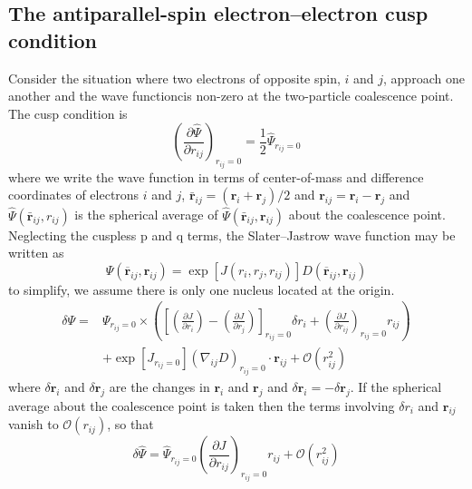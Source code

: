 \documentclass[12pt]{article}
\begin{document}
\subsection*{\normalsize The antiparallel-spin electron–electron cusp condition}

Consider the situation where two electrons of opposite spin, $i$ and $j$, approach 
one another and the wave functioncis non-zero at the two-particle coalescence point.
The cusp condition is
\begin{equation}\label{2}
    \left(\frac{\partial \hat{\Psi}}{\partial r_{i j}}\right)_{r_{i j}=0}=
    \frac{1}{2} \hat{\Psi}_{r_{i j}=0}
\end{equation} 
where we write the wave function in terms of center-of-mass and difference coordinates 
of electrons $i$ and $j$, $\bar{\mathbf{r}}_{ij}=(\mathbf{r}_i+\mathbf{r}_j)/2$ and 
$\mathbf{r}_{ij}=\mathbf{r}_i-\mathbf{r}_j$ and 
$\hat{\Psi}(\bar{\mathbf{r}}_{ij},r_{ij})$ is the spherical average of 
$\hat{\Psi}(\bar{\mathbf{r}}_{ij},\mathbf{r}_{ij})$ about the coalescence point. 
Neglecting the cuspless p and q terms, the Slater–Jastrow wave function may be 
written as
\begin{equation}
    \Psi\left(\overline{\mathbf{r}}_{ij},\mathbf{r}_{i j}\right)=\exp\left[J
    \left(r_{i},r_{j},r_{i j}\right)\right]D\left(\overline{\mathbf{r}}_{ij},
    \mathbf{r}_{i j}\right)
\end{equation}
to simplify, we assume there is only one nucleus located at the origin.
\begin{equation}
    \begin{split}
        \delta\Psi=&\Psi_{r_{ij}=0}\times\left(\left[\left(\frac{\partial J}{\partial
        r_i}\right)-\left(\frac{\partial J}{\partial r_j}\right)\right]_{r_{ij}=0}
        \delta r_i+\left(\frac{\partial J}{\partial r_{ij}}\right)_{r_{ij}=0}r_{ij}
        \right)\\
        &+\exp\left[J_{r_{ij}=0}\right]\left(\nabla_{ij} D\right)_{r_{ij}=0}
        \cdot\mathbf{r}_{ij}+\mathcal{O}\left(r_{ij}^{2}\right)
    \end{split}
\end{equation}
where $\delta\mathbf{r}_i$ and $\delta\mathbf{r}_j$ are the changes in $\mathbf{r}_i$ 
and $\mathbf{r}_j$ and $\delta\mathbf{r}_i=-\delta\mathbf{r}_j$.  If the spherical 
average about the coalescence point is taken then the terms involving $\delta r_i$ 
and $\mathbf{r}_{ij}$ vanish to $\mathcal{O}(r_{ij})$, so that
\begin{equation}
    \delta \hat{\Psi}=\hat{\Psi}_{r_{i j}=0}\left(\frac{\partial J}{\partial r_{i j}}
    \right)_{r_{i j}=0}r_{i j}+\mathcal{O}\left(r_{i j}^{2}\right)
\end{equation} 
\end{document}
